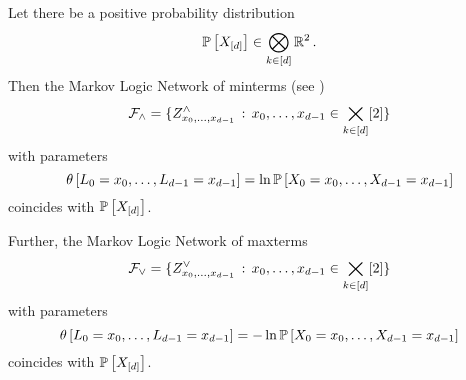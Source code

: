 \begin{theorem}
    \label{the:maximalClausesRepresentation}\label{the:mintermExpressivityMLN}
    Let there be a positive probability distribution
    \[ \mathbb{P}\left[X_{[d]}\right] \in \bigotimes_{k\in[d]}\mathbb{R}^2 \, . \]
    Then the Markov Logic Network of minterms (see )
    \[ \mathcal{F}_{\land} = \{Z^{\land}_{{x_{0},\ldots,x_{d-1}}} \, : \, {x_{0},\ldots,x_{d-1}}\in\bigtimes_{k\in[d]}[2] \}\]
    with parameters %
    \[ \canparamat{\selvariableof{0}=\catindexof{0},\ldots,\selvariableof{\atomorder-1}=\catindexof{\atomorder-1}}%
    = \ln \probat{\indexedcatvariables} \]
    coincides with $\mathbb{P}\left[X_{[d]}\right]$.

    Further, the Markov Logic Network of maxterms
    \[ \mathcal{F}_{\lor} = \{Z^{\lor}_{{x_{0},\ldots,x_{d-1}}} \, : \, {x_{0},\ldots,x_{d-1}}\in\bigtimes_{k\in[d]}[2] \}\]
    with parameters
    \[ \canparamat{\selvariableof{0}=\catindexof{0},\ldots,\selvariableof{\atomorder-1}=\catindexof{\atomorder-1}} %
    = - \ln\probat{\indexedcatvariables} \]
    coincides with $\mathbb{P}\left[X_{[d]}\right]$.
\end{theorem}
